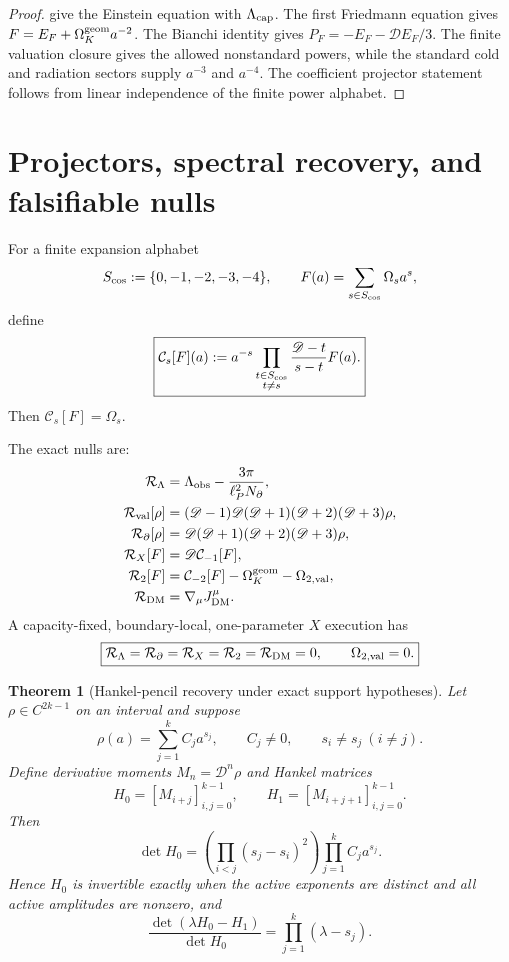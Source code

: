 \documentclass[aps,prd,reprint,nofootinbib,superscriptaddress]{revtex4-2}
\numberwithin{equation}{section}
\theoremstyle{definition}
\theoremstyle{plain}
\newtheorem{theorem}{Theorem}[section]
\newcommand{\Dil}{\mathscr D}
\newcommand{\Ncap}{N_{\partial}}
\begin{document}
\begin{proof}
 give the Einstein equation with \(\Lambda_{\rm cap}\).  The first Friedmann equation gives \(F=E_F+\Omega_K^{\rm geom}a^{-2}\).  The Bianchi identity gives \(P_F=-E_F-\Dil E_F/3\).  The finite valuation closure gives the allowed nonstandard powers, while the standard cold and radiation sectors supply \(a^{-3}\) and \(a^{-4}\).  The coefficient projector statement follows from linear independence of the finite power alphabet.
\end{proof}

\section{Projectors, spectral recovery, and falsifiable nulls}

For a finite expansion alphabet
\[
S_{\rm cos}:=\{0,-1,-2,-3,-4\},
\qquad
F(a)=\sum_{s\in S_{\rm cos}}\Omega_s a^s,
\]
define
\begin{equation}
\boxed{
\mathcal C_s[F](a)
:=
a^{-s}
\prod_{\substack{t\in S_{\rm cos}\\t\ne s}}
\frac{\Dil-t}{s-t}F(a).
}
\end{equation}
Then \(\mathcal C_s[F]=\Omega_s\).

The exact nulls are:
\begin{align}
\mathcal R_\Lambda
&=
\Lambda_{\rm obs}
-
\frac{3\pi}{\ell_P^2\Ncap},
\\
\mathcal R_{\rm val}[\rho]
&=
(\Dil-1)\Dil(\Dil+1)(\Dil+2)(\Dil+3)\rho,
\\
\mathcal R_{\partial}[\rho]
&=
\Dil(\Dil+1)(\Dil+2)(\Dil+3)\rho,
\\
\mathcal R_X[F]
&=
\Dil\mathcal C_{-1}[F],
\\
\mathcal R_{2}[F]
&=
\mathcal C_{-2}[F]-\Omega_K^{\rm geom}-\Omega_{2,\rm val},
\\
\mathcal R_{\rm DM}
&=
\nabla_\mu J^\mu_{\rm DM}.
\end{align}
A capacity-fixed, boundary-local, one-parameter \(X\) execution has
\begin{equation}
\boxed{
\mathcal R_\Lambda=\mathcal R_{\partial}=\mathcal R_X=\mathcal R_2=\mathcal R_{\rm DM}=0,
\qquad
\Omega_{2,\rm val}=0.
}
\end{equation}

\begin{theorem}[Hankel-pencil recovery under exact support hypotheses]\label{thm:hankel-hyp}
Let \(\rho\in C^{2k-1}\) on an interval and suppose
\[
\rho(a)=\sum_{j=1}^k C_j a^{s_j},
\qquad
C_j\ne0,\qquad
s_i\ne s_j\ (i\ne j).
\]
Define derivative moments \(M_n=\Dil^n\rho\) and Hankel matrices
\[
H_0=[M_{i+j}]_{i,j=0}^{k-1},
\qquad
H_1=[M_{i+j+1}]_{i,j=0}^{k-1}.
\]
Then
\[
\det H_0=
\left(\prod_{i<j}(s_j-s_i)^2\right)
\prod_{j=1}^k C_ja^{s_j}.
\]
Hence \(H_0\) is invertible exactly when the active exponents are distinct and all active amplitudes are nonzero, and
\begin{equation}
\boxed{
\frac{\det(\lambda H_0-H_1)}{\det H_0}
=
\prod_{j=1}^k(\lambda-s_j).
}
\end{equation}
\end{theorem}
\end{document}
